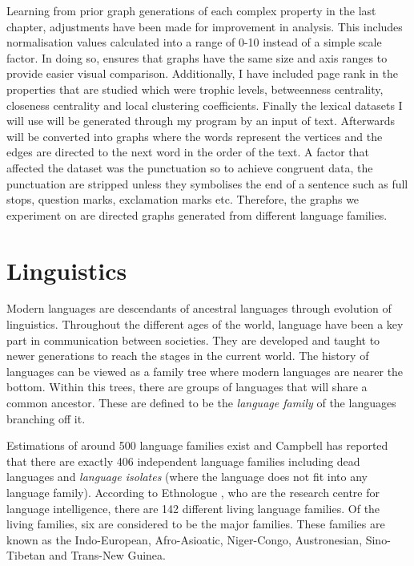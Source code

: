 Learning from prior graph generations of each complex property in the last chapter, adjustments have been made for improvement in analysis. This includes normalisation values calculated into a range of 0-10 instead of a simple scale factor. In doing so, ensures that graphs have the same size and axis ranges to provide easier visual comparison. Additionally, I have included page rank in the properties that are studied which were trophic levels, betweenness centrality, closeness centrality and local clustering coefficients. Finally the lexical datasets I will use will be generated through my program by an input of text. Afterwards will be converted into graphs where the words represent the vertices and the edges are directed to the next word in the order of the text. A factor that affected the dataset was the punctuation so to achieve congruent data, the punctuation are stripped unless they symbolises the end of a sentence such as full stops, question marks, exclamation marks etc. Therefore, the graphs we experiment on are directed graphs generated from different language families.

\section{Linguistics}
Modern languages are descendants of ancestral languages through evolution of linguistics. Throughout the different ages of the world, language have been a key part in communication between societies. They are developed and taught to newer generations to reach the stages in the current world. The history of languages can be viewed as a family tree where modern languages are nearer the bottom. Within this trees, there are groups of languages that will share a common ancestor. These are defined to be the \emph{language family} of the languages branching off it.

Estimations of around 500 language families exist and Campbell \cite{campbell2018many} has reported that there are exactly 406 independent language families including dead languages and \emph{language isolates} (where the language does not fit into any language family). According to Ethnologue \cite{eberhard2023a}, who are the research centre for language intelligence, there are 142 different living language families. Of the living families, six are considered to be the major families. These families are known as the Indo-European, Afro-Asioatic, Niger-Congo, Austronesian, Sino-Tibetan and Trans-New Guinea.

